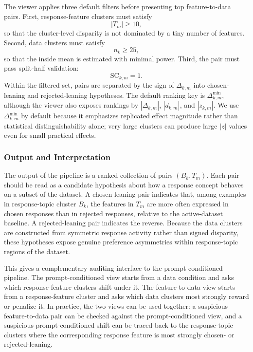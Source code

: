 \documentclass{article} %
\begin{document}
The viewer applies three default filters before presenting top feature-to-data pairs. First, response-feature clusters must satisfy
\begin{equation}
|T_m|\geq 10,
\end{equation}
so that the cluster-level disparity is not dominated by a tiny number of features. Second, data clusters must satisfy
\begin{equation}
n_k\geq 25,
\end{equation}
so that the inside mean is estimated with minimal power. Third, the pair must pass split-half validation:
\begin{equation}
\text{SC}_{k,m}=1.
\end{equation}
Within the filtered set, pairs are separated by the sign of $\Delta_{k,m}$ into chosen-leaning and rejected-leaning hypotheses. The default ranking key is $\Delta^{\min}_{k,m}$, although the viewer also exposes rankings by $|\Delta_{k,m}|$, $|d_{k,m}|$, and $|z_{k,m}|$. We use $\Delta^{\min}_{k,m}$ by default because it emphasizes replicated effect magnitude rather than statistical distinguishability alone; very large clusters can produce large $|z|$ values even for small practical effects.

\subsubsection{Output and Interpretation}
\label{app:ftd-output}

The output of the pipeline is a ranked collection of pairs $(B_k,T_m)$. Each pair should be read as a candidate hypothesis about how a response concept behaves on a subset of the dataset. A chosen-leaning pair indicates that, among examples in response-topic cluster $B_k$, the features in $T_m$ are more often expressed in chosen responses than in rejected responses, relative to the active-dataset baseline. A rejected-leaning pair indicates the reverse. Because the data clusters are constructed from symmetric response activity rather than signed disparity, these hypotheses expose genuine preference asymmetries within response-topic regions of the dataset.

This gives a complementary auditing interface to the prompt-conditioned pipeline. The prompt-conditioned view starts from a data condition and asks which response-feature clusters shift under it. The feature-to-data view starts from a response-feature cluster and asks which data clusters most strongly reward or penalize it. In practice, the two views can be used together: a suspicious feature-to-data pair can be checked against the prompt-conditioned view, and a suspicious prompt-conditioned shift can be traced back to the response-topic clusters where the corresponding response feature is most strongly chosen- or rejected-leaning.
\end{document}
